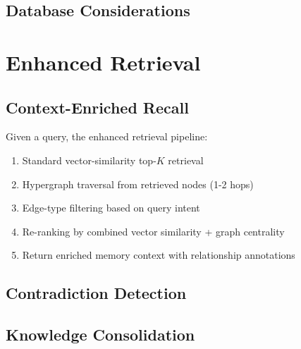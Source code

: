 \documentclass[man,12pt,floatsintext]{apa7}
\begin{document}

\subsection{Database Considerations}


\section{Enhanced Retrieval}

\subsection{Context-Enriched Recall}

Given a query, the enhanced retrieval pipeline:

\begin{enumerate}
  \item Standard vector-similarity top-$K$ retrieval
  \item Hypergraph traversal from retrieved nodes (1-2 hops)
  \item Edge-type filtering based on query intent
  \item Re-ranking by combined vector similarity + graph centrality
  \item Return enriched memory context with relationship annotations
\end{enumerate}

\subsection{Contradiction Detection}


\subsection{Knowledge Consolidation}

\end{document}
